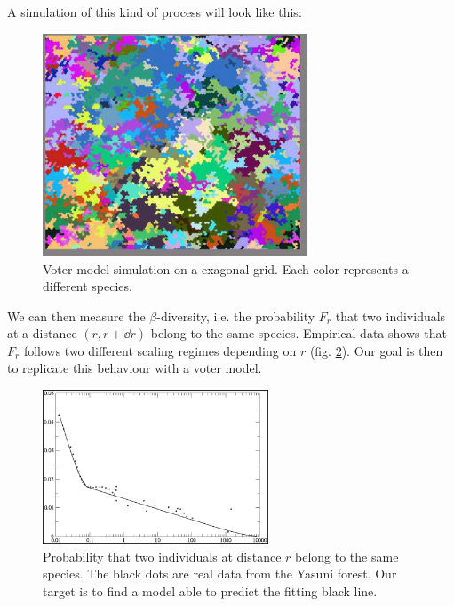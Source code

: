 \documentclass[../../main.tex]{subfiles}
\begin{document}
A simulation of this kind of process will look like this:
\begin{figure}[H]
    \centering
    \includegraphics[width=0.7\textwidth]{voter-sim.png}
    \caption{Voter model simulation on a exagonal grid. Each color represents a different species.}
    \label{fig:voter-sim}
\end{figure}

We can then measure the $\beta$-diversity, i.e. the probability $F_r$ that two individuals at a distance $(r,r+\dd{r})$ belong to the same species. Empirical data shows that $F_r$ follows two different scaling regimes depending on $r$ (fig. \ref{fig:beta-div}). Our goal is then to replicate this behaviour with a voter model.

\begin{figure}[H]
    \centering
    \includegraphics[width=0.6\textwidth]{beta-div.png}
    \caption{Probability that two individuals at distance $r$ belong to the same species. The black dots are real data from the Yasuni forest. Our target is to find a model able to predict the fitting black line.}
    \label{fig:beta-div}
\end{figure}
\end{document}
